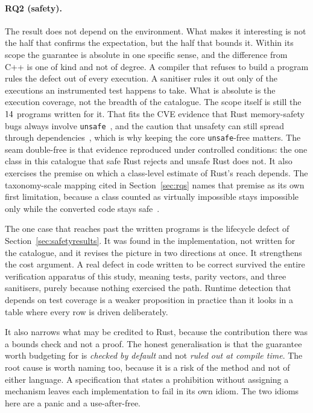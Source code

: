 \documentclass[english,oneside,a4paper,censored,csm,software-track-2020]{HYthesisML}
\begin{document}
\paragraph{RQ2 (safety).} The result does not depend on the environment. What makes it
interesting is not the half that confirms the expectation, but the half that bounds it. Within
its scope the guarantee is absolute in one specific sense, and the difference from C++ is one of
kind and not of degree. A compiler that refuses to build a program rules the defect out of
every execution. A sanitiser rules it out only of the executions an instrumented test
happens to take. What is absolute is the execution coverage, not the breadth of the catalogue.
The scope itself is still the $14$ programs written for it.
That fits the CVE evidence that Rust memory-safety bugs always involve
\texttt{unsafe}~\cite{xu2021rustcve}, and the caution that unsafety can still spread
through dependencies~\cite{evans2020rust}, which is why keeping the core \texttt{unsafe}-free
matters. The seam double-free is that evidence reproduced under controlled conditions: the one
class in this catalogue that safe Rust rejects and unsafe Rust does not. It also exercises the
premise on which a class-level estimate of Rust's reach depends. The taxonomy-scale mapping cited
in Section~\ref{sec:rqs} names that premise as its own first limitation, because a class counted
as virtually impossible stays impossible only while the converted code stays
safe~\cite{meneely2025justuserust}.

The one case that reaches past the written programs is the lifecycle defect of
Section~\ref{sec:safetyresults}. It was found in the implementation, not written for
the catalogue, and it revises the picture in two directions at once. It strengthens the cost
argument. A real defect in code written to be correct survived the entire verification
apparatus of this study, meaning tests, parity vectors, and three sanitisers, purely because
nothing exercised the path. Runtime detection that depends on test coverage is a weaker
proposition in practice than it looks in a table where every row is driven deliberately.

It also
narrows what may be credited to Rust, because the contribution there was a bounds check and not
a proof. The honest generalisation is that
the guarantee worth budgeting for is \emph{checked by default} and not \emph{ruled out at
compile time}. The root cause is worth naming too, because it is a risk of the method
and not of either language. A specification that states a prohibition without assigning a
mechanism leaves each implementation to fail in its own idiom. The two idioms here are a
panic and a use-after-free.
\end{document}
